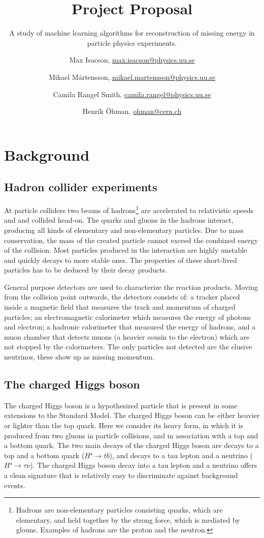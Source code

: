\documentclass{scrartcl}
\title{Project Proposal}
\subtitle{A study of machine learning algorithms for reconstruction of missing energy in particle physics experiments.}
\author{
  Max Isacson, \url{max.isacson@physics.uu.se}
  \and
  Mikael M\aa rtensson, \url{mikael.martensson@physics.uu.se}
  \and
  Camila Rangel Smith, \url{camila.rangel@physics.uu.se}
  \and
  Henrik Öhman, \url{ohman@cern.ch}
}
\begin{document}
\maketitle

\section{Background}
\subsection{Hadron collider experiments}
At particle colliders two beams of hadrons\footnote{Hadrons are non-elementary particles consisting quarks, which are elementary, and held together by the strong force, which is mediated by glouns. Examples of hadrons are the proton and the neutron.} are accelerated to relativistic speeds and and collided head-on. The quarks and gluons in the hadrons interact, producing all kinds of elementary and non-elementary particles. Due to mass conservation, the mass of the created particle cannot exceed the combined energy of the collision. Most particles produced in the interaction are highly unstable and quickly decays to more stable ones. The properties of these short-lived particles has to be deduced by their decay products.

General purpose detectors are used to characterize the reaction products. Moving from the collision point outwards, the detectors consists of: a tracker placed inside a magnetic field that measures the track and momentum of charged particles; an electromagnetic calorimeter which measures the energy of photons and electron; a hadronic calorimeter that measured the energy of hadrons, and a muon chamber that detects muons (a heavier cousin to the electron) which are not stopped by the calorimeters. The only particles not detected are the elusive neutrinos, these show up as missing momentum.

\subsection{The charged Higgs boson}
The charged Higgs boson is a hypothesized particle that is present in some extensions to the Standard Model. The charged Higgs boson can be either heavier or lighter than the top quark. Here we consider its heavy form, in which it is produced from two gluons in particle collisions, and in association with a top and a bottom quark. The two main decays of the charged Higgs boson are decays to a top and a bottom quark ($H⁺→tb$), and decays to a tau lepton and a neutrino ($H⁺→τν$). The charged Higgs boson decay into a tau lepton and a neutrino offers a clean signature that is relatively easy to discriminate against background events.
\end{document}
